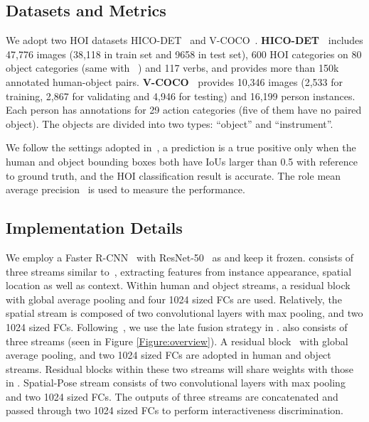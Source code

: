 \documentclass[10pt,twocolumn,letterpaper]{article}
\begin{document}
\subsection{Datasets and Metrics}
 We adopt two HOI datasets HICO-DET~\cite{hicodet} and V-COCO~\cite{vcoco}.
{\bf HICO-DET~\cite{hicodet}} includes 47,776 images (38,118 in train set and 9658 in test set), 600 HOI categories on 80 object categories (same with ~\cite{coco}) and 117 verbs, and provides more than 150k annotated human-object pairs.
{\bf V-COCO~\cite{vcoco}}
provides 10,346 images (2,533 for training, 2,867 for validating and 4,946 for testing) and 16,199 person instances. Each person has annotations for 29 action categories (five of them have no paired object).
The objects are divided into two types: ``object'' and ``instrument''.

 We follow the settings adopted in~\cite{hicodet}, \ie a prediction is a true positive only when the human and object bounding boxes both have IoUs larger than 0.5 with reference to ground truth, and the HOI classification result is accurate. The role mean average precision~\cite{vcoco} is used to measure the performance.

\subsection{Implementation Details}
We employ a Faster R-CNN~\cite{faster-rcnn} with ResNet-50~\cite{resnet} as  and keep it frozen.
 consists of three streams similar to~\cite{hicodet,gao2018ican}, extracting features  from instance appearance, spatial location as well as context. Within human and object streams, a residual block~\cite{resnet} with global average pooling and four 1024 sized FCs are used. Relatively, the spatial stream is composed of two convolutional layers with max pooling, and two 1024 sized FCs. Following~\cite{hicodet,gao2018ican}, we use the late fusion strategy in . 
 also consists of three streams (seen in Figure \ref{Figure:overview}). A residual block~\cite{resnet} with global average pooling, and two 1024 sized FCs are adopted in human and object streams.
Residual blocks within these two streams will share weights with those in .
Spatial-Pose stream consists of two convolutional layers with max pooling and two 1024 sized FCs. The outputs of three streams are concatenated and passed through two 1024 sized FCs to perform interactiveness discrimination.
\end{document}

